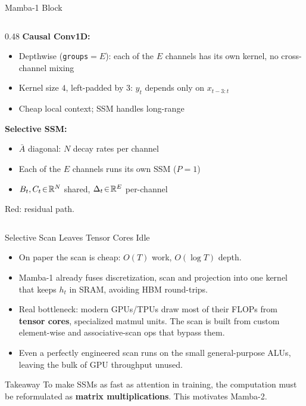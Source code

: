 \begin{frame}{Mamba-1 Block~\cite{gu2024mamba}}
\begin{columns}[T,onlytextwidth]
\begin{column}{0.48\textwidth}
      \vspace{0.3em}
      \textbf{Causal Conv1D:}
      \begin{itemize}
        \item Depthwise (\texttt{groups}$=E$): each of the $E$ channels has its own kernel, no cross-channel mixing
        \item Kernel size $4$, left-padded by $3$: $y_t$ depends only on $x_{t-3:t}$
        \item Cheap local context; SSM handles long-range
      \end{itemize}

      \vspace{0.3em}
      \textbf{Selective SSM:}
      \begin{itemize}
        \item $\bar{A}$ diagonal: $N$ decay rates per channel
        \item Each of the $E$ channels runs its own SSM ($P{=}1$)
        \item $B_t,C_t\!\in\!\mathbb{R}^N$ shared, $\Delta_t\!\in\!\mathbb{R}^E$ per-channel
      \end{itemize}

      \vspace{0.3em}
      \textcolor{mambared!85!black}{Red}: residual path.
    \end{column}
  \end{columns}
\end{frame}

\begin{frame}{Selective Scan Leaves Tensor Cores Idle}

  \begin{itemize}
    \item On paper the scan is cheap: $O(T)$ work, $O(\log T)$ depth.
    \item Mamba-1 already fuses discretization, scan and projection into one kernel that keeps $h_t$ in SRAM, avoiding HBM round-trips.
    \item \alert{Real bottleneck:} modern GPUs/TPUs draw most of their FLOPs from \textbf{tensor cores}, specialized matmul units. The scan is built from custom element-wise and associative-scan ops that bypass them.
    \item Even a perfectly engineered scan runs on the small general-purpose ALUs, leaving the bulk of GPU throughput unused.
  \end{itemize}

  \begin{alertblock}{Takeaway}
    To make SSMs as fast as attention in training, the computation must be reformulated as \textbf{matrix multiplications}. This motivates Mamba-2.
  \end{alertblock}
\end{frame}

